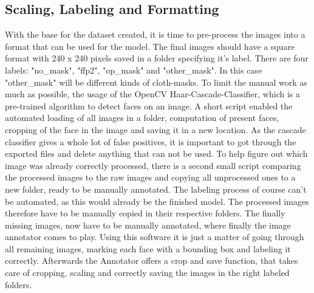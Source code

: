 \subsection{Scaling, Labeling and Formatting}

With the base for the dataset created, it is time to pre-process the images into
a format that can be used for the model. The final images should have a square
format with 240 x 240 pixels saved in a folder specifying it's label. There are
four labels: "no\_mask", "ffp2", "op\_mask" and "other\_mask". In this case
"other\_mask" will be different kinds of cloth-masks.
\newline
To limit the manual work as much as possible, the usage of the OpenCV
Haar-Cascade-Classifier, which is a pre-trained algorithm to detect faces on an
image. A short script enabled the automated loading of all images in a folder,
computation of present faces, cropping of the face in the image and saving it in
a new location. As the cascade classifier gives a whole lot of false positives,
it is important to got through the exported files and delete anything that can
not be used. To help figure out which image was already correctly processed,
there is a second small script comparing the processed images to the raw images
and copying all unprocessed ones to a new folder, ready to be manually
annotated. 
\newline
The labeling process of course can't be automated, as this would already be the
finished model. The processed images therefore have to be manually copied in
their respective folders.
\newline
The finally missing images, now have to be manually annotated, where finally the
image annotator comes to play. Using this software it is just a matter of going
through all remaining images, marking each face with a bounding box and labeling
it correctly. Afterwards the Annotator offers a crop and save function, that
takes care of cropping, scaling and correctly saving the images in the right
labeled folders.
